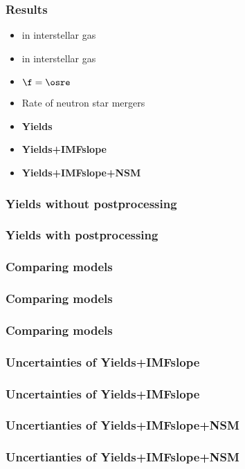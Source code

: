 \begin{frame}
\frametitle{Results}
\begin{itemize}
\item {} in interstellar gas
\item {} in interstellar gas
\item $\f = \osre$
\item Rate of neutron star mergers
\end{itemize}
\begin{itemize}
\item \textbf{Yields}
\item \textbf{Yields+IMFslope}
\item \textbf{Yields+IMFslope+NSM}
\end{itemize}
\end{frame}

\begin{frame}
\frametitle{\textbf{Yields} without postprocessing}
\end{frame}

\begin{frame}
\frametitle{\textbf{Yields} with postprocessing}
\end{frame}

\begin{frame}
\frametitle{Comparing models}
\end{frame}

\begin{frame}
\frametitle{Comparing models}
\end{frame}

\begin{frame}
\frametitle{Comparing models}
\end{frame}

\begin{frame}
\frametitle{Uncertainties of \textbf{Yields+IMFslope}}
\end{frame}

\begin{frame}
\frametitle{Uncertainties of \textbf{Yields+IMFslope}}
\end{frame}

\begin{frame}
\frametitle{Uncertianties of \textbf{Yields+IMFslope+NSM}}
\end{frame}

\begin{frame}
\frametitle{Uncertianties of \textbf{Yields+IMFslope+NSM}}
\end{frame}
